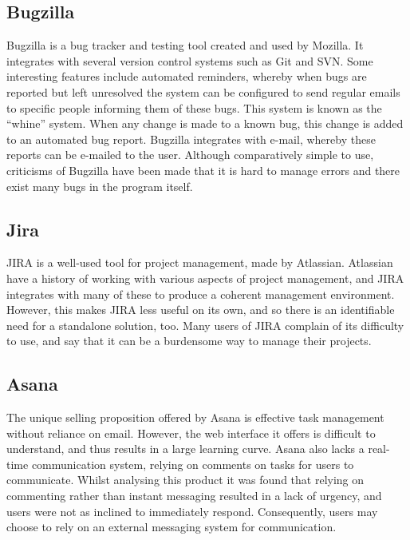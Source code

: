 \documentclass[a4paper]{l3proj}
\begin{document}
\subsection{Bugzilla}
\label{bugzilla}

Bugzilla is a bug tracker and testing tool created and used by Mozilla. It integrates with several version control systems such as Git and SVN.  Some interesting features include automated reminders, whereby when bugs are reported but left unresolved the system can be configured to send regular emails to specific people informing them of these bugs. This system is known as the ``whine'' system.  When any change is made to a known bug, this change is added to an automated bug report.  Bugzilla integrates with e-mail, whereby these reports can be e-mailed to the user. Although comparatively simple to use, criticisms of Bugzilla have been made that it is hard to manage errors and there exist many bugs in the program itself.

\subsection{Jira}
\label{jira}
JIRA is a well-used tool for project management, made by Atlassian. Atlassian have a history of working with various aspects of project management, and JIRA integrates with many of these to produce a coherent management environment. However, this makes JIRA less useful on its own, and so there is an identifiable need for a standalone solution, too. Many users of JIRA complain of its difficulty to use, and say that it can be a burdensome way to manage their projects.


\subsection{Asana}
\label{asana}

The unique selling proposition offered by Asana is effective task management without reliance on email. However, the web interface it offers is difficult to understand, and thus results in a large learning curve. Asana also lacks a real-time communication system, relying on comments on tasks for users to communicate. Whilst analysing this product it was found that relying on commenting rather than instant messaging resulted in a lack of urgency, and users were not as inclined to immediately respond. Consequently, users may choose to rely on an external messaging system for communication.
\end{document}
